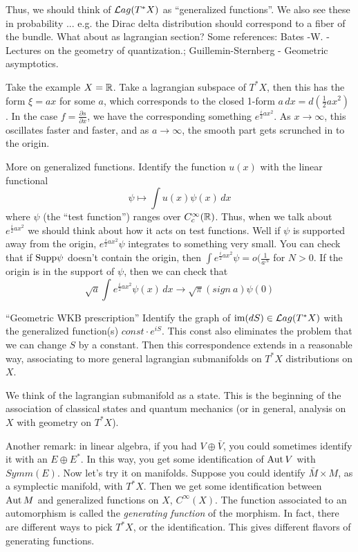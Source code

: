  Thus, we should think of $\mathcal{L}ag(T^*X)$ as ``generalized
 functions''.  We also see these in probability ... e.g. the Dirac
 delta distribution should correspond to a fiber of the bundle.
 What about as lagrangian section?  Some references: Bates -W. -
 Lectures on the geometry of quantization.; Guillemin-Sternberg -
 Geometric asymptotics.

 Take the example $X=\mathbb{R}$.  Take a lagrangian subspace of $T^*X$,
 then this has the form $\xi = ax$ for some $a$, which corresponds
 to the closed 1-form $a\,dx = d(\frac{1}{2} ax^2)$
 .  In the case
 $f=\frac{\partial s}{\partial x}$, we have the corresponding
 something $e^{\frac{i}{2} ax^2}$.  As $x\to \infty$, this
 oscillates faster and faster, and as $a\to \infty$, the smooth
 part gets scrunched in to the origin.

 More on generalized functions.  Identify the function $u(x)$ with
 the linear functional
 \[
    \psi\mapsto \int u(x)\psi(x)\, dx
 \]
 where $\psi$ (the ``test function'') ranges over
 $C^{\infty}_c(\mathbb{R})$.  Thus, when we talk about $e^{\frac{i}{2}
 ax^2}$ we should think about how it acts on test functions.  Well
 if $\psi$ is supported away from the origin, $e^{\frac{i}{2}
 ax^2} \psi$ integrates to something very small.  You can check
 that if $\text{\rm Supp} \psi$ doesn't contain the origin, then $\int e^{\frac{i}{2}
 ax^2}\psi = o(\frac{1}{a^N}$ for $N>0$.  If the origin is in the
 support of $\psi$, then we can check that
 \[
    \sqrt{a} \int e^{\frac{i}{2} ax^2}\psi(x)\, dx \to \sqrt\pi (sign\
    a)\psi (0)
 \]

 ``Geometric WKB prescription''  Identify the graph of
 $\text{im}(dS)\in \mathcal{L}ag(T^*X)$ with the generalized function(s)
 $const\cdot e^{iS}$.  This const also eliminates the problem that
 we can change $S$ by a constant.  Then this correspondence
 extends in a reasonable way, associating to more general
 lagrangian submanifolds on $T^*X$ distributions on $X$.

 We think of the lagrangian submanifold as a state.  This is the
 beginning of the association of classical states and quantum
 mechanics (or in general, analysis on $X$ with geometry on
 $T^*X$).

 Another remark:  in linear algebra, if you had $V\oplus \bar V$,
 you could sometimes identify it with an $E\oplus E^*$.  In this
 way, you get some identification of $\text{\rm Aut}\, V$ with $Symm(E)$.  Now
 let's try it on manifolds.  Suppose you could identify $\bar
 M\times M$, as a symplectic manifold, with $T^*X$.  Then we get
 some identification between $\text{\rm Aut}\, M$ and generalized functions on
 $X$, $C^{\infty}(X)$.  The function associated to an automorphism
 is called the \emph{generating function} of the morphism.  In
 fact, there are different ways to pick $T^*X$, or the
 identification.  This gives different flavors of generating
 functions.

